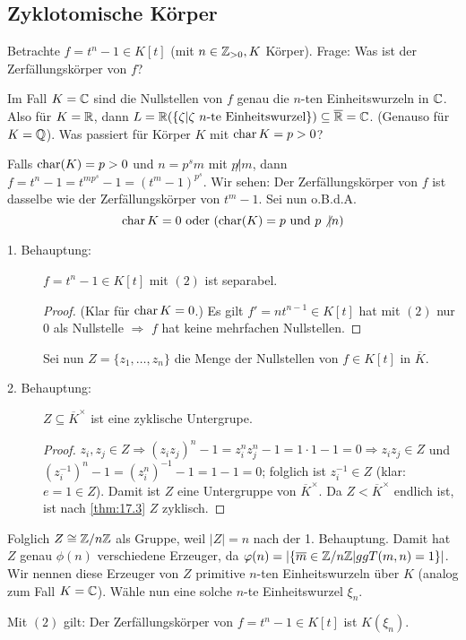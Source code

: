 \documentclass[12pt,a4paper]{scrartcl}
\begin{document}
\subsection{Zyklotomische Körper}
Betrachte $f = t^n-1\in K[t]$ (mit $n\in\mathbb Z_{>0}, K$ Körper). Frage: Was ist der Zerfällungskörper von $f$?

Im Fall $K = \mathbb C$ sind die Nullstellen von $f$ genau die $n$-ten Einheitswurzeln in $\mathbb C$. Also für $K = \mathbb R$, dann $L = \mathbb R(\{\zeta|\zeta\ n\text{-te Einheitswurzel}\})\subseteq \overline{\mathbb R} = \mathbb C$. (Genauso für $K = \mathbb Q$). Was passiert für Körper $K$ mit $\operatorname{char} K = p > 0$?


Falls $\operatorname{char} (K) = p>0$ und $n = p^sm$ mit $p\not |m$, dann $f = t^n-1 = t^{mp^s}-1 = (t^m-1)^{p^s}$. Wir sehen: Der Zerfällungskörper von $f$ ist dasselbe wie der Zerfällungskörper von $t^m-1$. Sei nun o.B.d.A.
\begin{equation}
\operatorname{char} K = 0\text{ oder }(\operatorname{char}(K) = p\text{ und }p\not| n)
\end{equation}
\begin{description}
	\item[1. Behauptung:] $f = t^n-1\in K[t]$ mit $(2)$ ist separabel.
	\begin{proof}
		(Klar für $\operatorname{char} K = 0$.) Es gilt $f' = nt^{n-1}\in K[t]$ hat mit $(2)$ nur $0$ als Nullstelle $\Rightarrow$ $f$ hat keine mehrfachen Nullstellen.
	\end{proof}
	Sei nun $Z = \{z_1,\dots, z_n\}$ die Menge der Nullstellen von $f\in K[t]$ in $\overline{K}$.
	\item[2. Behauptung:] $Z\subseteq \overline{K}^{\times}$ ist eine zyklische Untergrupe.
	\begin{proof}
		$z_i, z_j\in Z\Rightarrow (z_iz_j)^n-1 = z_i^nz_j^n-1 = 1\cdot 1-1 = 0\Rightarrow z_iz_j\in Z$ und $(z_i^{-1})^n -1 = (z_i^n)^{-1}-1 = 1-1 = 0$; folglich ist $z_i^{-1}\in Z$ (klar: $e  = 1\in Z$). Damit ist $Z$ eine Untergruppe von $\overline{K}^{\times}$. Da $Z<\overline{K}^{\times}$ endlich ist, ist nach \ref{thm:17.3} $Z$ zyklisch. 
	\end{proof}
\end{description}
Folglich $Z \cong \mathbb Z/n\mathbb Z$ als Gruppe, weil $|Z| = n$ nach der 1. Behauptung. Damit hat $Z$ genau $\phi(n)$ verschiedene Erzeuger, da $\varphi(n) = |\{\overline{m}\in \mathbb Z/n\mathbb Z|ggT (m,n) = 1\}|$. %
Wir nennen diese Erzeuger von $Z$ primitive $n$-ten Einheitswurzeln über $K$ (analog zum Fall $K = \mathbb C$). Wähle nun eine solche $n$-te Einheitswurzel $\xi_n$.
\begin{lem}
	Mit $(2)$ gilt: Der Zerfällungskörper von $f = t^n-1\in K[t]$ ist $K(\xi_n)$.
\end{lem}
\end{document}
